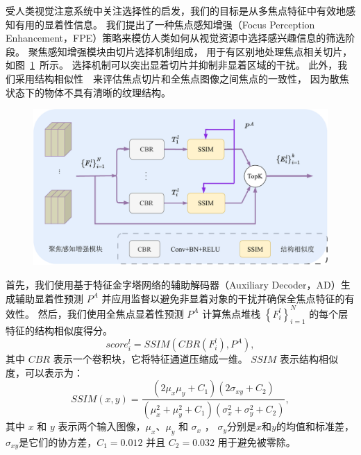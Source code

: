 %
%
%
%
受人类视觉注意系统中关注选择性的启发，我们的目标是从多焦点特征中有效地感知有用的显着性信息。 我们提出了一种焦点感知增强（Focus Perception Enhancement，FPE）策略来模仿人类如何从视觉资源中选择感兴趣信息的筛选阶段。 
聚焦感知增强模块由切片选择机制组成，
用于有区别地处理焦点相关切片，
如图~\ref{cpt3_fig1:fpe}~所示。
选择机制可以突出显着切片并抑制非显着区域的干扰。 
此外，我们采用结构相似性~\cite{wang2003multiscale}~来评估焦点切片和全焦点图像之间焦点的一致性，
因为散焦状态下的物体不具有清晰的纹理结构。 
%
%
%
%
\begin{figure}[!ht]
	\centering
	\includegraphics[width=0.90\linewidth]{figures/chapter3/fpe}
	\label{cpt3_fig1:fpe}
\end{figure}
%
%
%
%
\par
%
%
首先，我们使用基于特征金字塔网络的辅助解码器（Auxiliary Decoder，AD）生成辅助显着性预测 $ P^{A} $ 并应用监督以避免非显着对象的干扰并确保全焦点特征的有效性。 然后，我们使用全焦点显着性预测 $ P^{A} $ 计算焦点堆栈 $ \left \{ F_{i}^{l} \right \}_{i=1}^{N} $ 的每个层特征的结构相似度得分。 
\begin{equation}
	score_{i}^{l} = SSIM \left ( CBR \left ( F_{i}^{l} \right ), P^{A} \right ),
\end{equation}
%
%
其中 $CBR$ 表示一个卷积块，它将特征通道压缩成一维。 $SSIM$ 表示结构相似度，可以表示为： 
%
%
\begin{equation} 	
	SSIM(x,y)=\frac{\left ( 2\mu_{x}\mu_{y}+C_{1} \right ) \left (  2\sigma_{xy}+C_{2} \right )  } 	
	{\left ( \mu_{x}^{2} + \mu_{y}^{2}+C_{1}\right ) \left ( \sigma_{x}^{2}+ \sigma_{y}^{2} + C_{2} \right ) } , 	
\end{equation}
其中 $x$ 和 $y$ 表示两个输入图像，$\mu_{x}$、$\mu_{y}$ 和 $\sigma_{x}$ ， $\sigma_{y}$分别是$x$和$y$的均值和标准差，$\sigma_{xy}$是它们的协方差，$C_{1} = 0.012$ 并且 $C_{2} = 0.032$ 用于避免被零除。 
